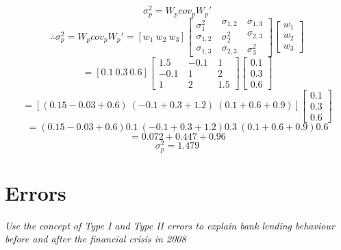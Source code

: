 \documentclass[11pt, english]{article}
\begin{document}
	$$\sigma_p^2=W_pcov_pW_p'$$
	$$\therefore\sigma_p^2=W_pcov_pW_p'=[w_1\ w_2\ w_3]\left[\begin{matrix}\sigma_1^2\\\sigma_{1,2}\\\sigma_{1,3}\end{matrix}\ \begin{matrix}\sigma_{1,2}\\\sigma_2^2\\\sigma_{2,3}\end{matrix}\ \begin{matrix}\sigma_{1,3}\\\sigma_{2,3}\\\sigma_3^2\end{matrix}\right]\begin{bmatrix}w_1\\w_2\\w_3\end{bmatrix}$$
	$$=[0.1\ 0.3\ 0.6]\left[\begin{matrix}1.5\\-0.1\\1\end{matrix}\ \begin{matrix}-0.1\\1\\2\end{matrix}\ \begin{matrix}1\\2\\1.5\end{matrix}\right]\begin{bmatrix}0.1\\0.3\\0.6\end{bmatrix}$$
	$$=\left[(0.15-0.03+0.6)\ (-0.1+0.3+1.2)\ (0.1+0.6+0.9)\right]\begin{bmatrix}0.1\\0.3\\0.6\end{bmatrix}$$
	$$=(0.15-0.03+0.6)0.1\ (-0.1+0.3+1.2)0.3\ (0.1+0.6+0.9)0.6$$
	$$=0.072+0.447+0.96$$
	$$\sigma_p^2=1.479$$

\newpage 

\section{Errors}

	\textit{Use the concept of Type I and Type II errors to explain bank lending behaviour before and after the financial crisis in 2008}
\end{document}

